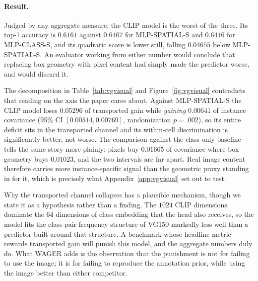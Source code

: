 \paragraph{Result.} Judged by any aggregate measure, the CLIP model is the worst of the
three. Its top-1 accuracy is $0.6161$ against $0.6467$ for MLP-SPATIAL-S and $0.6416$ for
MLP-CLASS-S, and its quadratic score is lower still, falling $0.04655$ below
MLP-SPATIAL-S. An evaluator working from either number would conclude that replacing box
geometry with pixel content had simply made the predictor worse, and would discard it.

The decomposition in Table~\ref{tab:vgvisual} and Figure~\ref{fig:vgvisual} contradicts
that reading on the axis the paper cares about. Against MLP-SPATIAL-S the CLIP model
loses $0.05296$ of transported gain while \emph{gaining} $0.00641$ of instance
covariance (95\% CI $[0.00514,0.00769]$, randomization $p=.002$), so its entire deficit
sits in the transported channel and its within-cell discrimination is significantly better,
not worse. The comparison against the class-only baseline tells the same story more
plainly: pixels buy $0.01665$ of covariance where box geometry buys $0.01023$, and the
two intervals are far apart. Real image content therefore carries more instance-specific
signal than the geometric proxy standing in for it, which is precisely what
Appendix~\ref{app:vgvisual} set out to test.

Why the transported channel collapses has a plausible mechanism, though we state it as a
hypothesis rather than a finding. The $1024$ CLIP dimensions dominate
the $64$ dimensions of class embedding that the head also receives, so the model fits the
class-pair frequency structure of VG150 markedly less well than a predictor built around
that structure. A benchmark whose headline metric rewards transported gain will punish this
model, and the aggregate numbers duly do. What WAGER adds is the observation that the
punishment is not for failing to use the image; it is for failing to reproduce the
annotation prior, while using the image better than either competitor.

